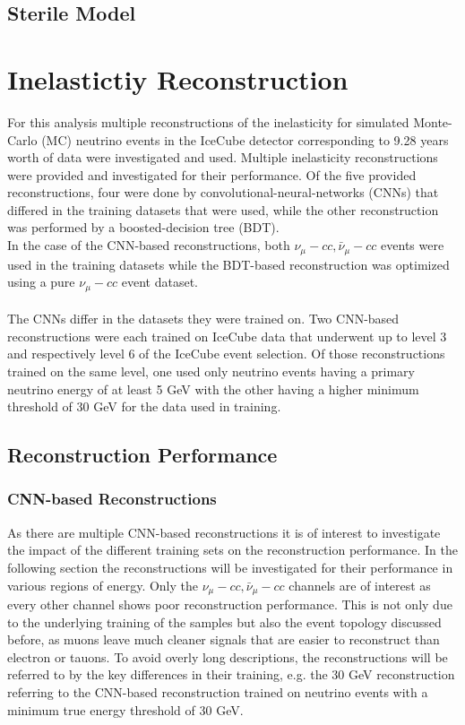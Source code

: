\documentclass[a4paper,12pt,numbered]{article}
\begin{document}
\subsection{Sterile Model}
\section{Inelastictiy Reconstruction}

For this analysis multiple reconstructions of the inelasticity for simulated Monte-Carlo (MC) neutrino events in the IceCube detector corresponding to 9.28 years worth of data were investigated and used. 
Multiple inelasticity reconstructions were provided and investigated for their performance. Of the five provided reconstructions, four were done by convolutional-neural-networks (CNNs) that differed in the training datasets that were used, while the other reconstruction was performed by a boosted-decision tree (BDT).
\\
In the case of the CNN-based reconstructions, both $\nu_\mu-cc, \bar{\nu}_\mu-cc$ events were used in the training datasets while the BDT-based reconstruction was optimized using a pure $\nu_\mu-cc$ event dataset.
\\ \\
The CNNs differ in the datasets they were trained on. Two CNN-based reconstructions were each trained on IceCube data that underwent up to level 3 and respectively level 6 of the IceCube event selection. Of those reconstructions trained on the same level, one used only neutrino events having a primary neutrino energy of at least 5 GeV with the other having a higher minimum threshold of 30 GeV for the data used in training.

\subsection{Reconstruction Performance}
\subsubsection{CNN-based Reconstructions}

As there are multiple CNN-based reconstructions it is of interest to investigate the impact of the different training sets on the reconstruction performance. In the following section the reconstructions will be investigated for their performance in various regions of energy. Only the $\nu_\mu-cc, \bar{\nu}_\mu-cc$ channels are of interest as every other channel shows poor reconstruction performance. This is not only due to the underlying training of the samples but also the event topology discussed before, as muons leave much cleaner signals that are easier to reconstruct than electron or tauons. To avoid overly long descriptions, the reconstructions will be referred to by the key differences in their training, e.g. the 30 GeV reconstruction referring to the CNN-based reconstruction trained on neutrino events with a minimum true energy threshold of 30 GeV.
\end{document}
